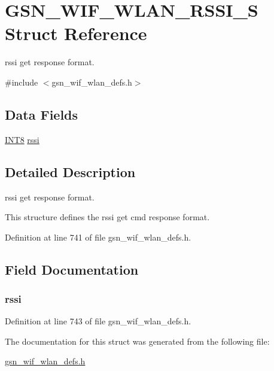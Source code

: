 \hypertarget{a00395}{
\section{GSN\_\-WIF\_\-WLAN\_\-RSSI\_\-S Struct Reference}
\label{a00395}
}


rssi get response format.  




{\ttfamily \#include $<$gsn\_\-wif\_\-wlan\_\-defs.h$>$}

\subsection*{Data Fields}
\begin{DoxyCompactItemize}
\item 
\hyperlink{a00660_ga307b8734c020247f6bac4fcde0dcfbb9}{INT8} \hyperlink{a00395_a1655ee4c98e91aaf1c7714c22f3a2fcd}{rssi}
\end{DoxyCompactItemize}


\subsection{Detailed Description}
rssi get response format. 

This structure defines the rssi get cmd response format. 

Definition at line 741 of file gsn\_\-wif\_\-wlan\_\-defs.h.



\subsection{Field Documentation}
\hypertarget{a00395_a1655ee4c98e91aaf1c7714c22f3a2fcd}{
\subsubsection[{rssi}]{ {\bf rssi}}}
\label{a00395_a1655ee4c98e91aaf1c7714c22f3a2fcd}


Definition at line 743 of file gsn\_\-wif\_\-wlan\_\-defs.h.



The documentation for this struct was generated from the following file:\begin{DoxyCompactItemize}
\item 
\hyperlink{a00613}{gsn\_\-wif\_\-wlan\_\-defs.h}\end{DoxyCompactItemize}

